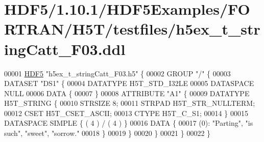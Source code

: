 \hypertarget{_h_d_f5_21_810_81_2_h_d_f5_examples_2_f_o_r_t_r_a_n_2_h5_t_2testfiles_2h5ex__t__string_catt___f03_8ddl_source}{}\section{H\+D\+F5/1.10.1/\+H\+D\+F5\+Examples/\+F\+O\+R\+T\+R\+A\+N/\+H5\+T/testfiles/h5ex\+\_\+t\+\_\+string\+Catt\+\_\+\+F03.ddl}
\label{_h_d_f5_21_810_81_2_h_d_f5_examples_2_f_o_r_t_r_a_n_2_h5_t_2testfiles_2h5ex__t__string_catt___f03_8ddl_source}

\begin{DoxyCode}
00001 \hyperlink{namespace_h_d_f5}{HDF5} \textcolor{stringliteral}{"h5ex\_t\_stringCatt\_F03.h5"} \{
00002 GROUP \textcolor{stringliteral}{"/"} \{
00003    DATASET \textcolor{stringliteral}{"DS1"} \{
00004       DATATYPE  H5T\_STD\_I32LE
00005       DATASPACE  NULL
00006       DATA \{
00007       \}
00008       ATTRIBUTE \textcolor{stringliteral}{"A1"} \{
00009          DATATYPE  H5T\_STRING \{
00010             STRSIZE 8;
00011             STRPAD H5T\_STR\_NULLTERM;
00012             CSET H5T\_CSET\_ASCII;
00013             CTYPE H5T\_C\_S1;
00014          \}
00015          DATASPACE  SIMPLE \{ ( 4 ) / ( 4 ) \}
00016          DATA \{
00017          (0): \textcolor{stringliteral}{"Parting"}, \textcolor{stringliteral}{"is such"}, \textcolor{stringliteral}{"sweet"}, \textcolor{stringliteral}{"sorrow."}
00018          \}
00019       \}
00020    \}
00021 \}
00022 \}
\end{DoxyCode}

